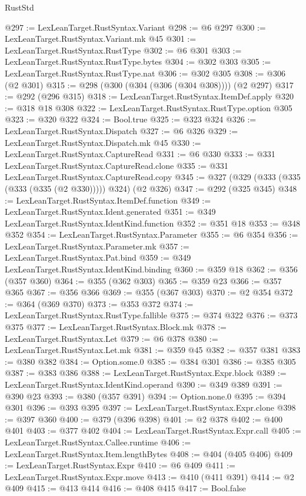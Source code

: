 \begin{lexlean}{RustStd}
\begin{coremodule}
@297 := LexLeanTarget.RustSyntax.Variant
@298 := @6 @297
@300 := LexLeanTarget.RustSyntax.Variant.mk @45
@301 := LexLeanTarget.RustSyntax.RustType
@302 := @6 @301
@303 := LexLeanTarget.RustSyntax.RustType.bytes
@304 := @302 @303
@305 := LexLeanTarget.RustSyntax.RustType.nat
@306 := @302 @305
@308 := @306 (@2 @301)
@315 := @298 (@300 (@304 (@306 (@304 @308)))) (@2 @297)
@317 := @292 (@296 @315)
@318 := LexLeanTarget.RustSyntax.ItemDef.apply
@320 := @318 @18 @308
@322 := LexLeanTarget.RustSyntax.RustType.option @305
@323 := @320 @322
@324 := Bool.true
@325 := @323 @324
@326 := LexLeanTarget.RustSyntax.Dispatch
@327 := @6 @326
@329 := LexLeanTarget.RustSyntax.Dispatch.mk @45
@330 := LexLeanTarget.RustSyntax.CaptureRead
@331 := @6 @330
@333 := @331 LexLeanTarget.RustSyntax.CaptureRead.clone
@335 := @331 LexLeanTarget.RustSyntax.CaptureRead.copy
@345 := @327 (@329 (@333 (@335 (@333 (@335 (@2 @330))))) @324) (@2 @326)
@347 := @292 (@325 @345)
@348 := LexLeanTarget.RustSyntax.ItemDef.function
@349 := LexLeanTarget.RustSyntax.Ident.generated
@351 := @349 LexLeanTarget.RustSyntax.IdentKind.function
@352 := @351 @18
@353 := @348 @352
@354 := LexLeanTarget.RustSyntax.Parameter
@355 := @6 @354
@356 := LexLeanTarget.RustSyntax.Parameter.mk
@357 := LexLeanTarget.RustSyntax.Pat.bind
@359 := @349 LexLeanTarget.RustSyntax.IdentKind.binding
@360 := @359 @18
@362 := @356 (@357 @360)
@364 := @355 (@362 @303)
@365 := @359 @23
@366 := @357 @365
@367 := @356 @366
@369 := @355 (@367 @303)
@370 := @2 @354
@372 := @364 (@369 @370)
@373 := @353 @372
@374 := LexLeanTarget.RustSyntax.RustType.fallible
@375 := @374 @322
@376 := @373 @375
@377 := LexLeanTarget.RustSyntax.Block.mk
@378 := LexLeanTarget.RustSyntax.Let
@379 := @6 @378
@380 := LexLeanTarget.RustSyntax.Let.mk
@381 := @359 @45
@382 := @357 @381
@383 := @380 @382
@384 := Option.some.{0}
@385 := @384 @301
@386 := @385 @305
@387 := @383 @386
@388 := LexLeanTarget.RustSyntax.Expr.block
@389 := LexLeanTarget.RustSyntax.IdentKind.operand
@390 := @349 @389
@391 := @390 @23
@393 := @380 (@357 @391)
@394 := Option.none.{0}
@395 := @394 @301
@396 := @393 @395
@397 := LexLeanTarget.RustSyntax.Expr.clone
@398 := @397 @360
@400 := @379 (@396 @398)
@401 := @2 @378
@402 := @400 @401
@403 := @377 @402
@404 := LexLeanTarget.RustSyntax.Expr.call
@405 := LexLeanTarget.RustSyntax.Callee.runtime
@406 := LexLeanTarget.RustSyntax.Item.lengthBytes
@408 := @404 (@405 @406)
@409 := LexLeanTarget.RustSyntax.Expr
@410 := @6 @409
@411 := LexLeanTarget.RustSyntax.Expr.move
@413 := @410 (@411 @391)
@414 := @2 @409
@415 := @413 @414
@416 := @408 @415
@417 := Bool.false

\end{coremodule}
\end{lexlean}
